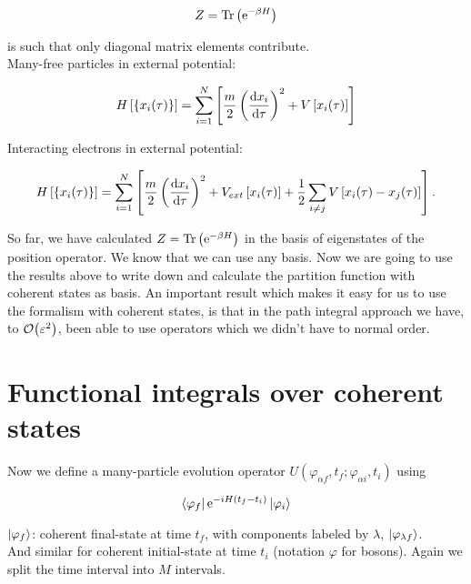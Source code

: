 \begin{equation*}
    Z = \Tr \left( \mathrm{e}^{-\beta H} \right)
\end{equation*}

is such that only diagonal matrix elements contribute. \\ 

Many-free particles in external potential: 

\begin{equation*}
    H\left[\{x_{i}(\tau)\}\right] = \sum_{i=1}^{N} \left[ \frac{m}{2} \left(\dv{x_{i}}{\tau}\right)^{2} + V\left[x_{i}(\tau)\right] \right]
\end{equation*}

Interacting electrons in external potential: 

\begin{equation*}
    H\left[\{x_{i}(\tau)\}\right] = \sum_{i=1}^{N} \left[ \frac{m}{2} \left(\dv{x_{i}}{\tau}\right)^{2} + V_{ext}\left[x_{i}(\tau)\right] + \frac{1}{2}\sum_{i\neq j} V\left[x_{i}(\tau) - x_{j}(\tau)\right] \right].
\end{equation*}

So far, we have calculated $Z = \Tr \left( \mathrm{e}^{-\beta H} \right)$ in the basis of eigenstates of the position operator. We know that we can use any basis. Now we are going to use the results above to write down and calculate the partition function with coherent states as basis. An important result which makes it easy for us to use the formalism with coherent states, is that in the path integral approach we have, to $\order{\varepsilon^{2}}$, been able to use operators which we didn't have to normal order. 

\section{Functional integrals over coherent states}

Now we define a many-particle evolution operator $U(\varphi_{\alpha f}, t_{f}; \varphi_{\alpha i}, t_{i})$ using 

\begin{equation*}
    \bra{\varphi_{f}} \mathrm{e}^{-iH(t_{f} - t_{i})} \ket{\varphi_{i}}
\end{equation*}

$\ket{\varphi_{f}}$: coherent final-state at time $t_{f}$, with components labeled by $\lambda$, $\ket{\varphi_{\lambda f}}$. \\

And similar for coherent initial-state at time $t_{i}$ (notation $\varphi$ for bosons). Again we split the time interval into $M$ intervals. 

